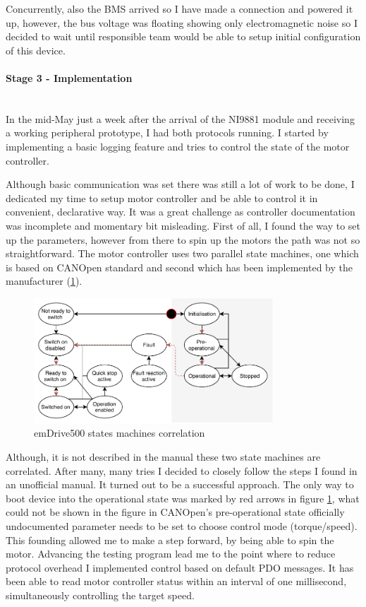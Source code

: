 Concurrently, also the BMS arrived so I have made a connection and powered it up, however, the bus voltage was floating showing only electromagnetic noise so I decided to wait until responsible team would be able to setup initial configuration of this device.

\paragraph{Stage 3 - Implementation}   
\addtocounter{section}{1}
\mbox{}\\
In the mid-May just a week after the arrival of the NI9881 module and receiving a working peripheral prototype, I had both protocols running. I started by implementing a basic logging feature and tries to control the state of the motor controller. 

Although basic communication was set there was still a lot of work to be done, I dedicated my time to setup motor controller and be able to control it in convenient, declarative way.
It was a great challenge as controller documentation was incomplete and momentary bit misleading. First of all, I found the way to set up the parameters, however from there to spin up the motors the path was not so straightforward. 
The motor controller uses two parallel state machines, one which is based on CANOpen standard and second which has been implemented by the manufacturer (\ref{fig:em500_states}). 
\begin{figure}[H]
    \centering
    \includegraphics[width=0.8\textwidth]{figures/em500_state}
    \caption{emDrive500 states machines correlation}
    \label{fig:em500_states}
\end{figure}
Although, it is not described in the manual these two state machines are correlated. After many, many tries I decided to closely follow the steps I found in an unofficial manual. It turned out to be a successful approach. The only way to boot device into the operational state was marked by red arrows in figure \ref{fig:em500_states}, what could not be shown in the figure in CANOpen's pre-operational state officially undocumented parameter needs to be set to choose control mode (torque/speed). This founding allowed me to make a step forward, by being able to spin the motor.
Advancing the testing program lead me to the point where to reduce protocol overhead I implemented control based on default PDO messages. It has been able to read motor controller status within an interval of one millisecond, simultaneously controlling the target speed.

